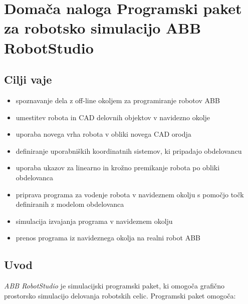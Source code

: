 

\chapter[ABB RobotStudio]{Doma\v ca naloga \newline Programski paket za robotsko \newline simulacijo ABB RobotStudio}

\begin{mdframed}[backgroundcolor=green!20, shadow=true,roundcorner=8pt]
\vspace{-0.35cm}
\section{Cilji vaje}
\begin{itemize}
\item spoznavanje dela z off-line okoljem za programiranje robotov ABB
\item umestitev robota in CAD delovnih objektov  v navidezno okolje
\item uporaba novega vrha robota v obliki novega CAD orodja
\item definiranje uporabniških koordinatnih sistemov, ki pripadajo obdelovancu
\item uporaba ukazov za linearno in krožno premikanje robota po obliki obdelovanca
\item priprava programa za vodenje robota v navideznem okolju s pomočjo točk definiranih z modelom obdelovanca
\item simulacija izvajanja programa v navideznem okolju
\item prenos programa iz navideznega okolja na realni robot ABB

\end{itemize}
\end{mdframed}

\section{Uvod}
\emph{ABB RobotStudio} je simulacijski programski paket, ki omogoča grafično
prostorsko simulacijo delovanja robotskih celic. Programski paket omogoča:

